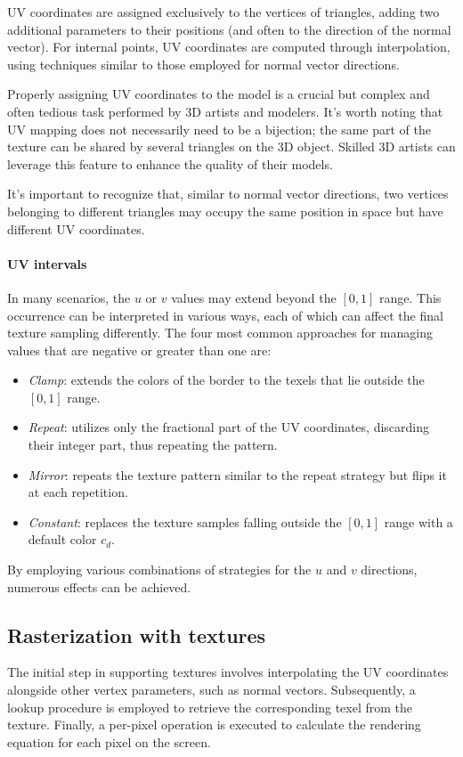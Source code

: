UV coordinates are assigned exclusively to the vertices of triangles, adding two additional parameters to their positions (and often to the direction of the normal vector). 
For internal points, UV coordinates are computed through interpolation, using techniques similar to those employed for normal vector directions.

Properly assigning UV coordinates to the model is a crucial but complex and often tedious task performed by 3D artists and modelers. 
It's worth noting that UV mapping does not necessarily need to be a bijection; the same part of the texture can be shared by several triangles on the 3D object. 
Skilled 3D artists can leverage this feature to enhance the quality of their models.

It's important to recognize that, similar to normal vector directions, two vertices belonging to different triangles may occupy the same position in space but have different UV coordinates.

\paragraph*{UV intervals}
In many scenarios, the $u$ or $v$ values may extend beyond the $[0, 1]$ range. 
This occurrence can be interpreted in various ways, each of which can affect the final texture sampling differently. 
The four most common approaches for managing values that are negative or greater than one are:
\begin{itemize}
    \item \textit{Clamp}: extends the colors of the border to the texels that lie outside the $[0, 1]$ range.
    \item \textit{Repeat}: utilizes only the fractional part of the UV coordinates, discarding their integer part, thus repeating the pattern.
    \item \textit{Mirror}: repeats the texture pattern similar to the repeat strategy but flips it at each repetition.
    \item \textit{Constant}: replaces the texture samples falling outside the $[0, 1]$ range with a default color $c_d$.
\end{itemize}
By employing various combinations of strategies for the $u$ and $v$ directions, numerous effects can be achieved.

\subsection{Rasterization with textures}
The initial step in supporting textures involves interpolating the UV coordinates alongside other vertex parameters, such as normal vectors.
Subsequently, a lookup procedure is employed to retrieve the corresponding texel from the texture. 
Finally, a per-pixel operation is executed to calculate the rendering equation for each pixel on the screen.

